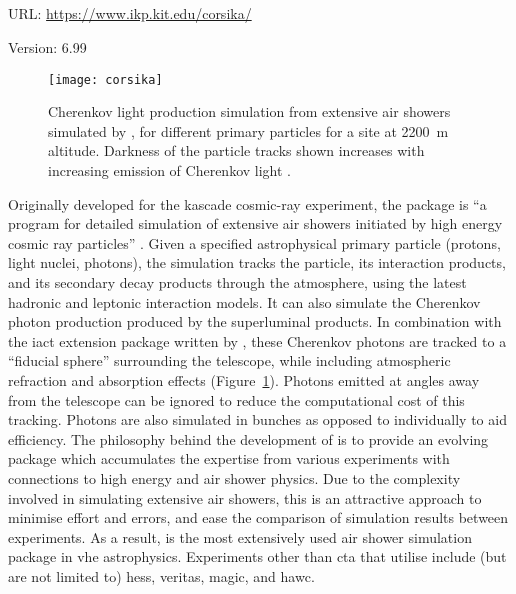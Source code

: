 \subsection{}
\vspace{-0.7em}
\noindent \hspace{\parindent} {\tiny URL: \url{https://www.ikp.kit.edu/corsika/} \par}
\noindent \hspace{\parindent} {\tiny Version: 6.99 \par}

\begin{figure}
  \texttt{[image: corsika]}
  \caption[ extensive air shower simulations.]{Cherenkov light production simulation from extensive air showers simulated by , for different primary particles for a site at \SI{2200}{m} altitude. Darkness of the particle tracks shown increases with increasing emission of Cherenkov light \cite{Bernlohr2008}.}
  \label{fig:corsika}
\end{figure}

\noindent Originally developed for the \gls{kascade} cosmic-ray experiment, the  package is ``a program for detailed simulation of extensive air showers initiated by high energy cosmic ray particles'' \cite[][p. i]{heck1998corsika}. Given a specified astrophysical primary particle (protons, light nuclei, photons), the simulation tracks the particle, its interaction products, and its secondary decay products through the atmosphere, using the latest hadronic and leptonic interaction models. It can also simulate the Cherenkov photon production produced by the superluminal products. In combination with the \gls{iact} extension package written by \textcite{Bernlohr2008}, these Cherenkov photons are tracked to a ``fiducial sphere'' surrounding the telescope, while including atmospheric refraction and absorption effects (Figure~\ref{fig:corsika}). Photons emitted at angles away from the telescope can be ignored to reduce the computational cost of this tracking. Photons are also simulated in bunches as opposed to individually to aid efficiency. The philosophy behind the development of  is to provide an evolving package which accumulates the expertise from various experiments with connections to high energy and air shower physics. Due to the complexity involved in simulating extensive air showers, this is an attractive approach to minimise effort and errors, and ease the comparison of simulation results between experiments. As a result,  is the most extensively used air shower simulation package in \gls{vhe} astrophysics. Experiments other than \gls{cta} that utilise  include (but are not limited to) \gls{hess}, \gls{veritas}, \gls{magic}, and \gls{hawc}.

